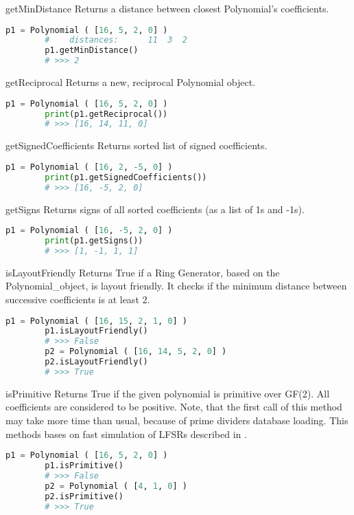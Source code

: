  {getMinDistance} {} {
	Returns a distance between closest Polynomial's coefficients.
}
\begin{lstlisting}[language=Python]
		p1 = Polynomial ( [16, 5, 2, 0] )
		#    distances:      11  3  2
		p1.getMinDistance()
		# >>> 2
\end{lstlisting}

 {getReciprocal} {} {
	Returns a new, reciprocal Polynomial object.
}
\begin{lstlisting}[language=Python]
		p1 = Polynomial ( [16, 5, 2, 0] )
		print(p1.getReciprocal())
		# >>> [16, 14, 11, 0]
\end{lstlisting}

 {getSignedCoefficients} {} {
	Returns sorted list of signed coefficients.
}
		\begin{lstlisting}[language=Python]
		p1 = Polynomial ( [16, 2, -5, 0] )
		print(p1.getSignedCoefficients())
		# >>> [16, -5, 2, 0]
\end{lstlisting}

 {getSigns} {} {
	Returns signs of all sorted coefficients (as a list of 1s and -1s).
}
\begin{lstlisting}[language=Python]
		p1 = Polynomial ( [16, -5, 2, 0] )
		print(p1.getSigns())
		# >>> [1, -1, 1, 1]
\end{lstlisting}

\label{polynomial:islayoutfriendly}
 {isLayoutFriendly} {} {
	Returns True if a Ring Generator, based on the Polynomial\_object, is layout friendly. It checks if the minimum distance between successive coefficients is at least 2.
}
\begin{lstlisting}[language=Python]
		p1 = Polynomial ( [16, 15, 2, 1, 0] )
		p1.isLayoutFriendly()
		# >>> False
		p2 = Polynomial ( [16, 14, 5, 2, 0] )
		p2.isLayoutFriendly()
		# >>> True
\end{lstlisting}

 {isPrimitive} {} {
	Returns True if the given polynomial is primitive over GF(2). All coefficients are considered to be positive. Note, that the first call of this method may take more time than usual, because of prime dividers database loading.
	This methods bases on fast simulation of LFSRs described in \cite{lfsr:fastsim}.
}
\begin{lstlisting}[language=Python]
		p1 = Polynomial ( [16, 5, 2, 0] )
		p1.isPrimitive()
		# >>> False
		p2 = Polynomial ( [4, 1, 0] )
		p2.isPrimitive()
		# >>> True
\end{lstlisting}

